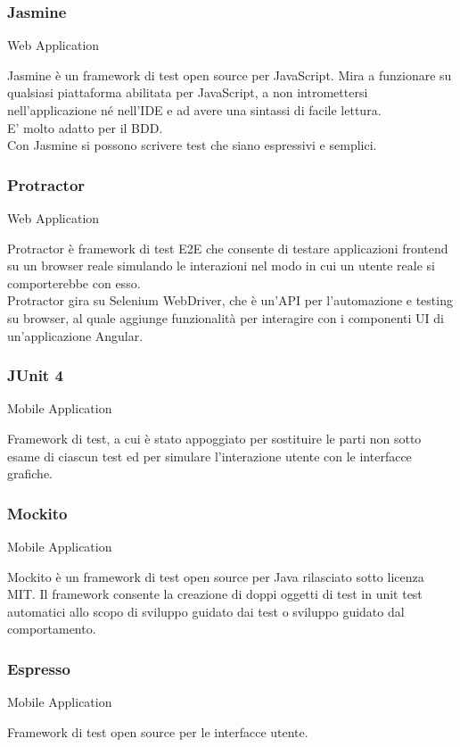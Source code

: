 \documentclass[../manuale-sviluppatore.tex]{subfiles}
\begin{document}
\subsubsection{Jasmine}%
\label{subs:jasmine}
Web Application

Jasmine è un framework di test open source per JavaScript. Mira a funzionare su qualsiasi piattaforma abilitata per JavaScript, a non intromettersi nell'applicazione né nell'IDE e ad avere una sintassi di facile lettura.\\
E' molto adatto per il BDD.\\
Con Jasmine si possono scrivere test che siano espressivi e semplici.

\subsubsection{Protractor}%
\label{subs:protractor}
Web Application

Protractor è framework di test E2E che consente di testare applicazioni frontend su un browser reale simulando le interazioni nel modo in cui un utente reale si comporterebbe con esso.\\
Protractor gira su Selenium WebDriver, che è un’API per l’automazione e testing su browser, al quale aggiunge funzionalità per interagire con i componenti UI di un’applicazione Angular.

\subsubsection{JUnit 4}%
\label{subs:junit4}
Mobile Application

Framework di test, a cui è stato appoggiato  per sostituire le parti non sotto esame di ciascun test ed  per simulare l’interazione utente con le interfacce grafiche.

\subsubsection{Mockito}%
\label{subs:mockito}
Mobile Application

Mockito è un framework di test open source per Java rilasciato sotto licenza MIT\@.
Il framework consente la creazione di doppi oggetti di test in unit test automatici allo scopo di sviluppo guidato dai test o sviluppo guidato dal comportamento.

\subsubsection{Espresso}%
\label{subs:espresso}
Mobile Application

Framework di test open source per le interfacce utente.
\end{document}
